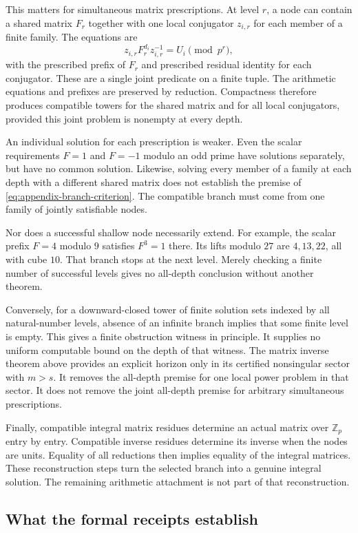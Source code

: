 This matters for simultaneous matrix prescriptions. At level $r$, a node
can contain a shared matrix $F_r$ together with one local conjugator
$z_{i,r}$ for each member of a finite family. The equations are
\[
 z_{i,r}F_r^{d_i}z_{i,r}^{-1}=U_i\pmod {p^r},
\]
with the prescribed prefix of $F_r$ and prescribed residual identity for
each conjugator. These are a single joint predicate on a finite tuple.
The arithmetic equations and prefixes are preserved by reduction.
Compactness therefore produces compatible towers for the shared matrix
and for all local conjugators, provided this joint problem is nonempty at
every depth.

An individual solution for each prescription is weaker. Even the scalar
requirements $F=1$ and $F=-1$ modulo an odd prime have solutions
separately, but have no common solution. Likewise, solving every member
of a family at each depth with a different shared matrix does not establish
the premise of \eqref{eq:appendix-branch-criterion}. The compatible branch
must come from one family of jointly satisfiable nodes.

Nor does a successful shallow node necessarily extend. For example, the
scalar prefix $F=4$ modulo $9$ satisfies $F^3=1$ there. Its lifts modulo
$27$ are $4,13,22$, all with cube $10$. That branch stops at the next
level. Merely checking a finite number of successful levels gives no
all-depth conclusion without another theorem.

Conversely, for a downward-closed tower of finite solution sets indexed
by all natural-number levels, absence of an infinite branch implies that
some finite level is empty. This gives a finite
obstruction witness in principle. It supplies no uniform computable bound
on the depth of that witness. The matrix inverse theorem above provides
an explicit horizon only in its certified nonsingular sector with $m>s$.
It removes the all-depth premise for one local power problem in that sector.
It does not remove the joint all-depth premise for arbitrary simultaneous
prescriptions.

Finally, compatible integral matrix residues determine an actual matrix
over $\mathbb Z_p$ entry by entry. Compatible inverse residues determine
its inverse when the nodes are units. Equality of all reductions then
implies equality of the integral matrices. These reconstruction steps turn
the selected branch into a genuine integral solution. The remaining
arithmetic attachment is not part of that reconstruction.

\subsection{What the formal receipts establish}

